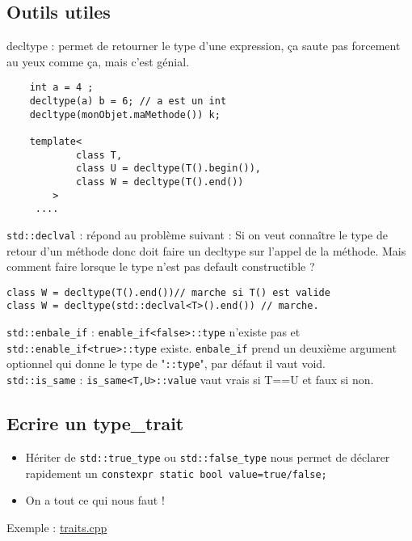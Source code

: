 \documentclass{beamer}
\begin{document}
\subsection{Outils utiles}

\begin{frame}[containsverbatim]
decltype : permet de retourner le type d'une expression, ça saute pas forcement au yeux comme ça, mais c'est génial.

\begin{lstlisting}
	int a = 4 ;
	decltype(a) b = 6; // a est un int
	decltype(monObjet.maMethode()) k; 

	template<
            class T,
            class U = decltype(T().begin()),
            class W = decltype(T().end())
        >
     .... 
\end{lstlisting}
\end{frame}

\begin{frame}[containsverbatim]
\lstinline{std::declval} : répond au problème suivant : Si on veut connaître le type de retour d'un méthode donc doit faire un decltype sur l'appel de la méthode. Mais comment faire lorsque le type n'est pas default constructible ? 
	\begin{lstlisting}
class W = decltype(T().end())// marche si T() est valide
class W = decltype(std::declval<T>().end()) // marche.
	\end{lstlisting}
	
\lstinline{std::enbale_if} : \lstinline{enable_if<false>::type} n'existe pas et \lstinline{std::enable_if<true>::type} existe. \lstinline{enbale_if} prend un deuxième argument optionnel qui donne le type de "\lstinline{::type}", par défaut il vaut void.
\\ 
\lstinline{std::is_same} : \lstinline{is_same<T,U>::value} vaut vrais si T==U et faux si non.

\end{frame}

\subsection{Ecrire un type\_trait}
\begin{frame}[containsverbatim]
\begin{itemize}
	\item Hériter de \lstinline{std::true_type} ou \lstinline{std::false_type} nous permet de déclarer rapidement un \lstinline{constexpr static bool value=true/false;}
	\item On a tout ce qui nous faut !
\end{itemize}


Exemple : \href{run:../code_demo/traits.cpp}{traits.cpp}\\

\end{frame}
\end{document}
